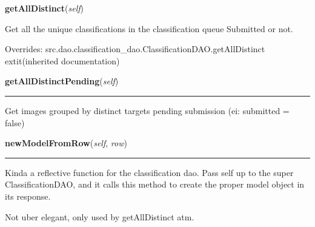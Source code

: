 \hspace{.8\funcindent}\begin{boxedminipage}{\funcwidth}

    \raggedright \textbf{getAllDistinct}(\textit{self})

\setlength{\parskip}{2ex}
    Get all the unique classifications in the classification queue 
    Submitted or not.

\setlength{\parskip}{1ex}
      Overrides: src.dao.classification\_dao.ClassificationDAO.getAllDistinct 	extit{(inherited documentation)}

    \end{boxedminipage}

    \label{src:dao:outgoing_manual_dao:OutgoingManualDAO:getAllDistinctPending}

    \vspace{0.5ex}

\hspace{.8\funcindent}\begin{boxedminipage}{\funcwidth}

    \raggedright \textbf{getAllDistinctPending}(\textit{self})

    \vspace{-1.5ex}

    \rule{\textwidth}{0.5\fboxrule}
\setlength{\parskip}{2ex}
    Get images grouped by distinct targets pending submission (ei: 
    submitted = false)

\setlength{\parskip}{1ex}
    \end{boxedminipage}

    \label{src:dao:outgoing_manual_dao:OutgoingManualDAO:newModelFromRow}

    \vspace{0.5ex}

\hspace{.8\funcindent}\begin{boxedminipage}{\funcwidth}

    \raggedright \textbf{newModelFromRow}(\textit{self}, \textit{row})

    \vspace{-1.5ex}

    \rule{\textwidth}{0.5\fboxrule}
\setlength{\parskip}{2ex}
    Kinda a reflective function for the classification dao. Pass self up to
    the super ClassificationDAO, and it calls this method to create the 
    proper model object in its response.

    Not uber elegant, only used by getAllDistinct atm.

\setlength{\parskip}{1ex}
    \end{boxedminipage}


